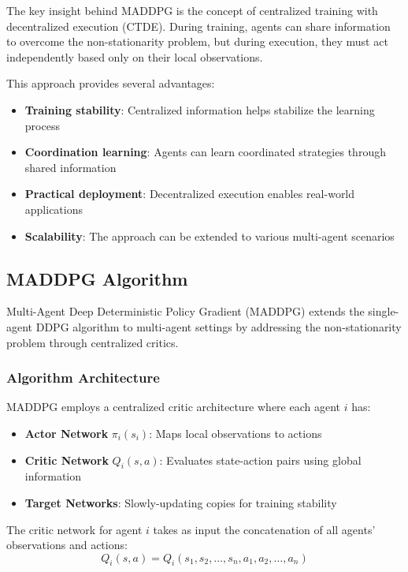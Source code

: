 \documentclass[conference]{IEEEtran}
\begin{document}
{{The key insight behind MADDPG is the concept of centralized training with decentralized execution (CTDE). During training, agents can share information to overcome the non-stationarity problem, but during execution, they must act independently based only on their local observations.

This approach provides several advantages:
\begin{itemize}
    \item \textbf{Training stability}: Centralized information helps stabilize the learning process
    \item \textbf{Coordination learning}: Agents can learn coordinated strategies through shared information
    \item \textbf{Practical deployment}: Decentralized execution enables real-world applications
    \item \textbf{Scalability}: The approach can be extended to various multi-agent scenarios
\end{itemize}

\subsection{MADDPG Algorithm}

Multi-Agent Deep Deterministic Policy Gradient (MADDPG) extends the single-agent DDPG algorithm to multi-agent settings by addressing the non-stationarity problem through centralized critics.

\subsubsection{Algorithm Architecture}

MADDPG employs a centralized critic architecture where each agent $i$ has:
\begin{itemize}
    \item \textbf{Actor Network} $\pi_i(s_i)$: Maps local observations to actions
    \item \textbf{Critic Network} $Q_i(s, a)$: Evaluates state-action pairs using global information
    \item \textbf{Target Networks}: Slowly-updating copies for training stability
\end{itemize}

The critic network for agent $i$ takes as input the concatenation of all agents' observations and actions:
\begin{equation}
Q_i(s, a) = Q_i(s_1, s_2, \ldots, s_n, a_1, a_2, \ldots, a_n)
\end{equation}

}}
\end{document}
